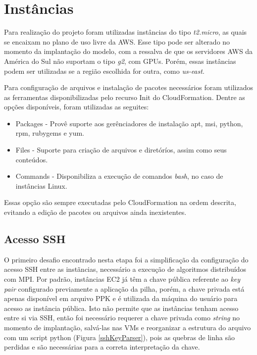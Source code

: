\documentclass[tg]{mdtufsm}
\begin{document}
\section{Instâncias}

Para realização do projeto foram utilizadas instâncias do tipo \emph{t2.micro}, as quais se encaixam no plano de uso livre da AWS. Esse tipo pode ser alterado no momento da implantação do modelo, com a ressalva de que os servidores AWS da América do Sul não suportam o tipo \emph{g2}, com GPUs. Porém, essas instâncias podem ser utilizadas se a região escolhida for outra, como \emph{us-east}.

Para configuração de arquivos e instalação de pacotes necessários foram utilizados as ferramentas disponibilizadas pelo recurso Init do CloudFormation. Dentre as opções disponíveis, foram utilizadas as seguites:

\begin{itemize}
\item Packages - Provê suporte aos gerênciadores de instalação apt, msi, python, rpm, rubygems e yum. 
\item Files - Suporte para criação de arquivos e diretóríos, assim como seus conteúdos.
\item Commands - Disponibiliza a execução de comandos \emph{bash}, no caso de instâncias Linux.
\end{itemize}

Essas opção são sempre executadas pelo CloudFormation na ordem descrita, evitando a edição de pacotes ou arquivos ainda inexistentes.

\subsection{Acesso SSH}

O primeiro desafio encontrado nesta etapa foi a simplificação da configuração do acesso SSH entre as instãncias, necessário a execução de algoritmos distribuídos com MPI. Por padrão, instâncias EC2 já têm a chave pública referente ao \emph{key pair} configurado previamente a aplicação da pilha, porém, a chave privada está apenas disponível em arquivo PPK e é utilizada da máquina do usuário para acesso as instância pública. Isto não permite que as instâncias tenham acesso entre si via SSH, então foi necessário requerer a chave privada como \emph{string} no momento de implantação, salvá-las nas VMs e reorganizar a estrutura do arquivo com um script python (Figura \ref{sshKeyParser}), pois as quebras de linha são perdidas e são necessárias para a correta interpretação da chave.
\end{document}
